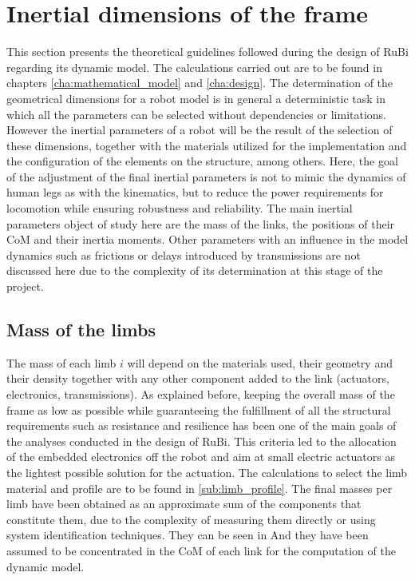
\section{Inertial dimensions of the frame} %
\label{sec:physical_properties}
This section presents the theoretical guidelines followed during the design of RuBi regarding its dynamic model.
The calculations carried out are to be found in chapters \ref{cha:mathematical_model} and \ref{cha:design}. 
The determination of the geometrical dimensions for a robot model is in general a deterministic task in which all the parameters can be selected without dependencies or limitations.
However the inertial parameters of a robot will be the result of the selection of these dimensions, together with the materials utilized for the implementation and the configuration of the elements on the structure, among others.
Here, the goal of the adjustment of the final inertial parameters is not to mimic the dynamics of human legs as with the kinematics, but to reduce the power requirements for locomotion while ensuring robustness and reliability.
The main inertial parameters object of study here are the mass of the links, the positions of their CoM and their inertia moments.
Other parameters with an influence in the model dynamics such as frictions or delays introduced by transmissions are not discussed here due to the complexity of its determination at this stage of the project.

\subsection{Mass of the limbs} %
\label{sub:mass_of_the_limbs}
The mass of each limb $i$ will depend on the materials used, their geometry and their density together with any other component added to the link (actuators, electronics, transmissions).
As explained before, keeping the overall mass of the frame as low as possible while guaranteeing the fulfillment of all the structural requirements such as resistance and resilience has been one of the main goals of the analyses conducted in the design of RuBi.
This criteria led to the allocation of the embedded electronics off the robot and aim at small electric actuators as the lightest possible solution for the actuation. 
The calculations to select the limb material and profile are to be found in \ref{sub:limb_profile}.
The final masses per limb have been obtained as an approximate sum of the components that constitute them, due to the complexity of measuring them directly or using system identification techniques. 
They can be seen in %
And they have been assumed to be concentrated in the CoM of each link for the computation of the dynamic model.


